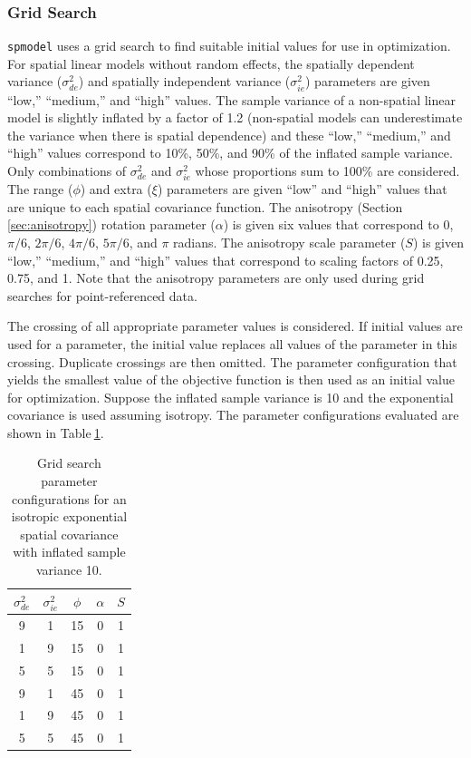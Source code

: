\documentclass{article}
\begin{document}
\hypertarget{grid-search}{%
\subsubsection{Grid Search}\label{grid-search}}

\texttt{spmodel} uses a grid search to find suitable initial values for
use in optimization. For spatial linear models without random effects,
the spatially dependent variance (\(\sigma^2_{de}\)) and spatially
independent variance (\(\sigma^2_{ie}\)) parameters are given ``low,''
``medium,'' and ``high'' values. The sample variance of a non-spatial
linear model is slightly inflated by a factor of 1.2 (non-spatial models
can underestimate the variance when there is spatial dependence) and
these ``low,'' ``medium,'' and ``high'' values correspond to 10\%, 50\%,
and 90\% of the inflated sample variance. Only combinations of
\(\sigma^2_{de}\) and \(\sigma^2_{ie}\) whose proportions sum to 100\%
are considered. The range (\(\phi\)) and extra (\(\xi\)) parameters are
given ``low'' and ``high'' values that are unique to each spatial
covariance function. The anisotropy (Section\(~\)\ref{sec:anisotropy})
rotation parameter (\(\alpha\)) is given six values that correspond to
0, \(\pi/6\), \(2\pi/6\), \(4\pi/6\), \(5\pi/6\), and \(\pi\) radians.
The anisotropy scale parameter (\(S\)) is given ``low,'' ``medium,'' and
``high'' values that correspond to scaling factors of 0.25, 0.75, and 1.
Note that the anisotropy parameters are only used during grid searches
for point-referenced data.

The crossing of all appropriate parameter values is considered. If
initial values are used for a parameter, the initial value replaces all
values of the parameter in this crossing. Duplicate crossings are then
omitted. The parameter configuration that yields the smallest value of
the objective function is then used as an initial value for
optimization. Suppose the inflated sample variance is 10 and the
exponential covariance is used assuming isotropy. The parameter
configurations evaluated are shown in Table\(~\)\ref{tab:grid1}.

\begin{table}
  \centering
  \begin{tabular}{ccccc}
  \hline
  $\sigma^2_{de}$ & $\sigma^2_{ie}$ & $\phi$ & $\alpha$ & $S$ \\
  \hline
  9 & 1 & 15 & 0 & 1 \\
  1 & 9 & 15 & 0 & 1 \\
  5 & 5 & 15 & 0 & 1 \\
  9 & 1 & 45 & 0 & 1 \\
  1 & 9 & 45 & 0 & 1 \\
  5 & 5 & 45 & 0 & 1 \\
  \hline
  \end{tabular}
  \caption{Grid search parameter configurations for an isotropic exponential spatial covariance with inflated sample variance 10.}
  \label{tab:grid1}
\end{table}
\end{document}
